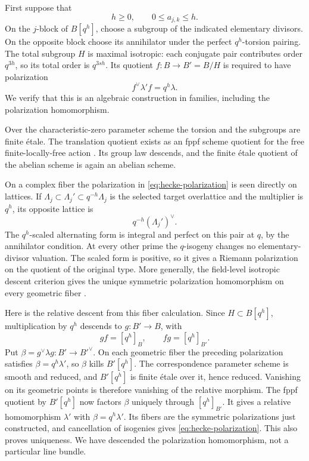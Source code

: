First suppose that
\begin{equation}\label{eq:positive-hecke-range}
h\geq0,\qquad 0\leq a_{j,k}\leq h.
\end{equation}
On the \(j\)-block of \(B[q^h]\), choose a subgroup of the indicated
elementary divisors.  On the opposite block choose its annihilator
under the perfect \(q^h\)-torsion pairing.  The total subgroup \(H\)
is maximal isotropic: each conjugate pair contributes order
\(q^{3h}\), so its total order is \(q^{3sh}\).
Its quotient \(f:B\to B'=B/H\) is required
to have polarization
\begin{equation}\label{eq:hecke-polarization}
f^\vee\lambda'f=q^h\lambda.
\end{equation}
We verify that this is an algebraic construction in families,
including the polarization homomorphism.

Over the characteristic-zero parameter scheme the torsion and the
subgroups are finite étale.  The translation quotient exists as an
fppf scheme quotient for the free finite-locally-free action
\cite[Tags~07S6 and~07S7]{StacksProject}.  Its group law descends,
and the finite étale quotient of the abelian scheme is again an
abelian scheme.

On a complex fiber the polarization in
\eqref{eq:hecke-polarization} is seen directly on lattices.  If
\(\Lambda_j\subset\Lambda_j'\subset q^{-h}\Lambda_j\) is the
selected target overlattice and the multiplier is \(q^h\), its
opposite lattice is
\[
q^{-h}(\Lambda_j')^\vee.
\]
The \(q^h\)-scaled alternating form is integral and perfect on this
pair at \(q\), by the annihilator condition.  At every other prime
the \(q\)-isogeny changes no elementary-divisor valuation.  The
scaled form is positive, so it gives a Riemann polarization on the
quotient of the original type.  More generally, the field-level
isotropic descent criterion gives the unique symmetric polarization
homomorphism on every geometric fiber
\cite[Chapter~XI, Proposition~11.25]{EdixhovenVanDerGeerMoonen2011Polarizations}.

Here is the relative descent from this fiber calculation.  Since
\(H\subset B[q^h]\), multiplication by \(q^h\) descends to
\(g:B'\to B\), with
\[
gf=[q^h]_B,\qquad fg=[q^h]_{B'}.
\]
Put \(\beta=g^\vee\lambda g:B'\to B'^\vee\).
On each geometric fiber the preceding polarization satisfies
\(\beta=q^h\lambda'\), so \(\beta\) kills \(B'[q^h]\).
The correspondence
parameter scheme is smooth and reduced, and \(B'[q^h]\) is finite
étale over it, hence reduced.  Vanishing on its geometric points is
therefore vanishing of the relative morphism.  The fppf quotient by
\(B'[q^h]\) now factors \(\beta\) uniquely through \([q^h]_{B'}\).
It gives a relative homomorphism \(\lambda'\) with
\(\beta=q^h\lambda'\).  Its fibers are the symmetric polarizations
just constructed, and cancellation of isogenies gives
\eqref{eq:hecke-polarization}.  This also proves uniqueness.  We
have descended the polarization homomorphism, not a particular
line bundle.

